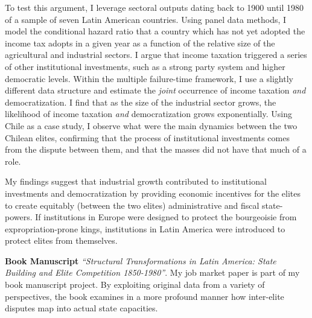 \documentclass[11pt]{letter} %
\begin{document}
\begin{letter}{}
To test this argument, I leverage sectoral outputs dating back to 1900 until 1980 of a sample of seven Latin American countries. Using panel data methods, I model the conditional hazard ratio that a country which has not yet adopted the income tax adopts in a given year as a function of the relative size of the agricultural and industrial sectors. I argue that income taxation triggered a series of other institutional investments, such as a strong party system and higher democratic levels. Within the multiple failure-time framework, I use a slightly different data structure and estimate the \emph{joint} occurrence of income taxation \emph{and} democratization. I find that as the size of the industrial sector grows, the likelihood of income taxation \emph{and} democratization grows exponentially. Using Chile as a case study, I observe what were the main dynamics between the two Chilean elites, confirming that the process of institutional investments comes from the dispute between them, and that the masses did not have that much of a role. 

My findings suggest that industrial growth contributed to institutional investments and democratization by providing economic incentives for the elites to create equitably (between the two elites) administrative and fiscal state-powers. If institutions in Europe were designed to protect the bourgeoisie from expropriation-prone kings, institutions in Latin America were introduced to protect elites from themselves.

{\bf Book Manuscript} \emph{``Structural Transformations in Latin America: State Building and Elite Competition 1850-1980''}. My job market paper is part of my book manuscript project. By exploiting original data from a variety of perspectives, the book examines in a more profound manner how inter-elite disputes map into actual state capacities.


\end{letter}
\end{document}
